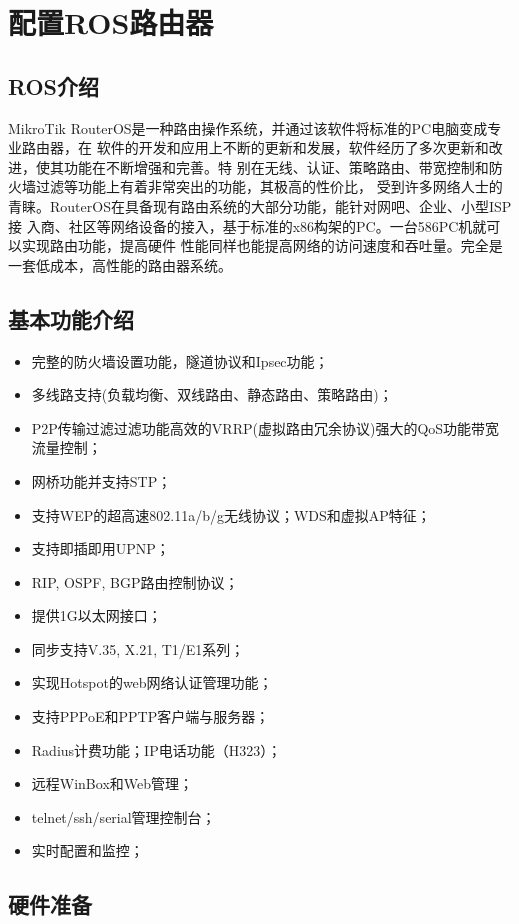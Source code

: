 \chapter{配置ROS路由器}

\section{ROS介绍}
MikroTik RouterOS\cite{ros}是一种路由操作系统，并通过该软件将标准的PC电脑变成专业路由器，在
软件的开发和应用上不断的更新和发展，软件经历了多次更新和改进，使其功能在不断增强和完善。特
别在无线、认证、策略路由、带宽控制和防火墙过滤等功能上有着非常突出的功能，其极高的性价比，
受到许多网络人士的青睐。RouterOS在具备现有路由系统的大部分功能，能针对网吧、企业、小型ISP接
入商、社区等网络设备的接入，基于标准的x86构架的PC。一台586PC机就可以实现路由功能，提高硬件
性能同样也能提高网络的访问速度和吞吐量。完全是一套低成本，高性能的路由器系统。

\section{基本功能介绍}

\begin{itemize}
\item 完整的防火墙设置功能，隧道协议和Ipsec功能；
\item 多线路支持(负载均衡、双线路由、静态路由、策略路由)；
\item P2P传输过滤过滤功能高效的VRRP(虚拟路由冗余协议)强大的QoS功能带宽流量控制；
\item 网桥功能并支持STP；
\item 支持WEP的超高速802.11a/b/g无线协议；WDS和虚拟AP特征；
\item 支持即插即用UPNP；
\item RIP, OSPF, BGP路由控制协议；
\item 提供1G以太网接口；
\item 同步支持V.35, X.21, T1/E1系列；
\item 实现Hotspot的web网络认证管理功能；
\item 支持PPPoE和PPTP客户端与服务器；
\item Radius计费功能；IP电话功能（H323）；
\item 远程WinBox和Web管理；
\item telnet/ssh/serial管理控制台；
\item 实时配置和监控；
\end{itemize}

\section{硬件准备}

